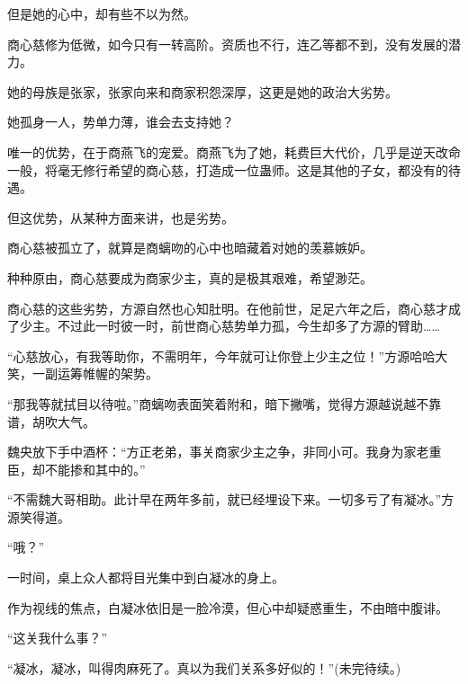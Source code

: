 \begin{this_body}
但是她的心中，却有些不以为然。

商心慈修为低微，如今只有一转高阶。资质也不行，连乙等都不到，没有发展的潜力。

她的母族是张家，张家向来和商家积怨深厚，这更是她的政治大劣势。

她孤身一人，势单力薄，谁会去支持她？

唯一的优势，在于商燕飞的宠爱。商燕飞为了她，耗费巨大代价，几乎是逆天改命一般，将毫无修行希望的商心慈，打造成一位蛊师。这是其他的子女，都没有的待遇。

但这优势，从某种方面来讲，也是劣势。

商心慈被孤立了，就算是商螭吻的心中也暗藏着对她的羡慕嫉妒。

种种原由，商心慈要成为商家少主，真的是极其艰难，希望渺茫。

商心慈的这些劣势，方源自然也心知肚明。在他前世，足足六年之后，商心慈才成了少主。不过此一时彼一时，前世商心慈势单力孤，今生却多了方源的臂助……

“心慈放心，有我等助你，不需明年，今年就可让你登上少主之位！”方源哈哈大笑，一副运筹帷幄的架势。

“那我等就拭目以待啦。”商螭吻表面笑着附和，暗下撇嘴，觉得方源越说越不靠谱，胡吹大气。

魏央放下手中酒杯：“方正老弟，事关商家少主之争，非同小可。我身为家老重臣，却不能掺和其中的。”

“不需魏大哥相助。此计早在两年多前，就已经埋设下来。一切多亏了有凝冰。”方源笑得道。

“哦？”

一时间，桌上众人都将目光集中到白凝冰的身上。

作为视线的焦点，白凝冰依旧是一脸冷漠，但心中却疑惑重生，不由暗中腹诽。

“这关我什么事？”

“凝冰，凝冰，叫得肉麻死了。真以为我们关系多好似的！”(未完待续。)

\end{this_body}

